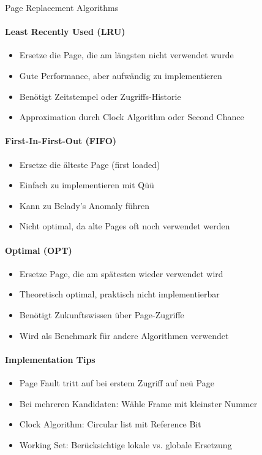 \begin{KR}{Page Replacement Algorithms}
    \paragraph{Least Recently Used (LRU)}
    \begin{itemize}
        \item Ersetze die Page, die am längsten nicht verwendet wurde
        \item Gute Performance, aber aufwändig zu implementieren
        \item Benötigt Zeitstempel oder Zugriffs-Historie
        \item Approximation durch Clock Algorithm oder Second Chance
    \end{itemize}
    
    \paragraph{First-In-First-Out (FIFO)}
    \begin{itemize}
        \item Ersetze die älteste Page (first loaded)
        \item Einfach zu implementieren mit Qüü
        \item Kann zu Belady's Anomaly führen
        \item Nicht optimal, da alte Pages oft noch verwendet werden
    \end{itemize}
    
    \paragraph{Optimal (OPT)}
    \begin{itemize}
        \item Ersetze Page, die am spätesten wieder verwendet wird
        \item Theoretisch optimal, praktisch nicht implementierbar
        \item Benötigt Zukunftswissen über Page-Zugriffe
        \item Wird als Benchmark für andere Algorithmen verwendet
    \end{itemize}
    
    \paragraph{Implementation Tips}
    \begin{itemize}
        \item Page Fault tritt auf bei erstem Zugriff auf neü Page
        \item Bei mehreren Kandidaten: Wähle Frame mit kleinster Nummer
        \item Clock Algorithm: Circular list mit Reference Bit
        \item Working Set: Berücksichtige lokale vs. globale Ersetzung
    \end{itemize}
\end{KR}


